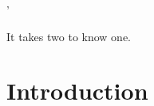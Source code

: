 '
\begin{savequote}[8cm]

  It takes two to know one.


\end{savequote}









\chapter{\label{chap:intro}Introduction}



\minitoc





